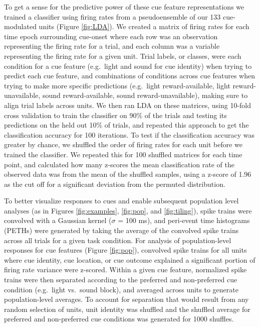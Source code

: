 \documentclass[11pt]{article}
\begin{document}
To get a sense for the predictive power of these cue feature representations we trained a classifier using firing rates from a pseudoensemble of our 133 cue-modulated units (Figure \ref{fig:LDA}). We created a matrix of firing rates for each time epoch surrounding cue-onset where each row was an observation representing the firing rate for a trial, and each column was a variable representing the firing rate for a given unit. Trial labels, or classes, were each condition for a cue feature (e.g.\ light and sound for cue identity) when trying to predict each cue feature, and combinations of conditions across cue features when trying to make more specific predictions (e.g.\ light reward-available, light reward-unavailable, sound reward-available, sound reward-unavailable), making sure to align trial labels across units. We then ran LDA on these matrices, using 10-fold cross validation to train the classifier on 90\% of the trials and testing its predictions on the held out 10\% of trials, and repeated this approach to get the classification accuracy for 100 iterations. To test if the classification accuracy was greater by chance, we shuffled the order of firing rates for each unit before we trained the classifier. We repeated this for 100 shuffled matrices for each time point, and calculated how many z-scores the mean classification rate of the observed data was from the mean of the shuffled samples, using a z-score of 1.96 as the cut off for a significant deviation from the permuted distribution.

To better visualize responses to cues and enable subsequent population
level analyses (as in Figures \ref{fig:examples}, \ref{fig:pop}, and
\ref{fig:tiling}), spike trains were convolved with a Gaussian kernel
($\sigma$ = 100 ms), and peri-event time histograms (PETHs) were
generated by taking the average of the convolved spike trains across all
trials for a given task condition. For analysis of population-level
responses for cue features (Figure \ref{fig:pop}), convolved spike
trains for all units where cue identity, cue location, or cue outcome
explained a significant portion of firing rate variance were
z-scored. Within a given cue feature, normalized spike trains were
then separated according to the preferred and non-preferred cue
condition (e.g.\ light vs.\ sound block), and averaged across units to
generate population-level averages. To account for separation that
would result from any random selection of units, unit identity was
shuffled and the shuffled average for preferred and non-preferred cue
conditions was generated for 1000 shuffles.
\end{document}
